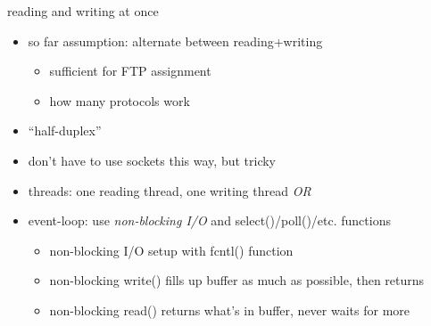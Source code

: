 \begin{frame}{reading and writing at once}
    \begin{itemize}
    \item so far assumption: alternate between reading+writing
        \begin{itemize}
        \item sufficient for FTP assignment
        \item how many protocols work
        \end{itemize}
    \item ``half-duplex''
    \item don't have to use sockets this way, but tricky
        \vspace{.5cm}
    \item threads: one reading thread, one writing thread \textit{OR}
    \item event-loop: use \textit{non-blocking I/O} and select()/poll()/etc. functions
        \begin{itemize}
        \item non-blocking I/O setup with fcntl() function
        \item non-blocking write() fills up buffer as much as possible, then returns
        \item non-blocking read() returns what's in buffer, never waits for more
        \end{itemize}
    \end{itemize}
\end{frame}
